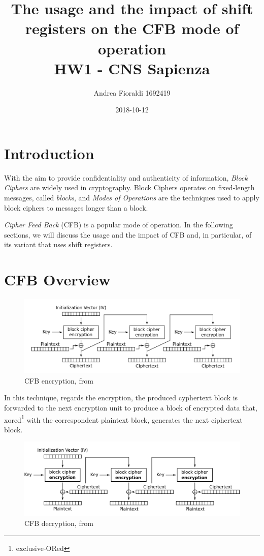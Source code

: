 \documentclass[11pt]{article}
\title{{\bf The usage and the impact of shift registers on the CFB mode of operation} \\ \bigskip \large HW1 - CNS Sapienza}
\date{2018-10-12}
\author{Andrea Fioraldi 1692419}
\begin{document}
\maketitle

\section{Introduction}

With the aim to provide confidentiality and authenticity of information, {\em Block Ciphers} are widely used in cryptography. Block Ciphers operates on fixed-length messages, called {\em blocks}, and {\em Modes of Operations} are the techniques used to apply block ciphers to messages longer than a block.

{\em Cipher Feed Back} (CFB) is a popular mode of operation.
In the following sections, we will discuss the usage and the impact of CFB and, in particular, of its variant that uses shift registers.

\section{CFB Overview}

\begin{figure}[!ht]
  \centering
  \includegraphics[width=1\textwidth]{pic1-hw1-1692419}
  \caption{CFB encryption, from \cite{wiki}}
  \label{fig:cfb_enc}
\end{figure}

In this technique, regards the encryption, the produced cyphertext block is forwarded to the next encryption unit to produce a block of encrypted data that, xored\footnote{exclusive-ORed} with the correspondent plaintext block, generates the next ciphertext block. 

\begin{figure}[!ht]
  \centering
  \includegraphics[width=1\textwidth]{pic2-hw1-1692419}
  \caption{CFB decryption, from \cite{wiki}}
  \label{fig:cfb_dec}
\end{figure}
\end{document}

